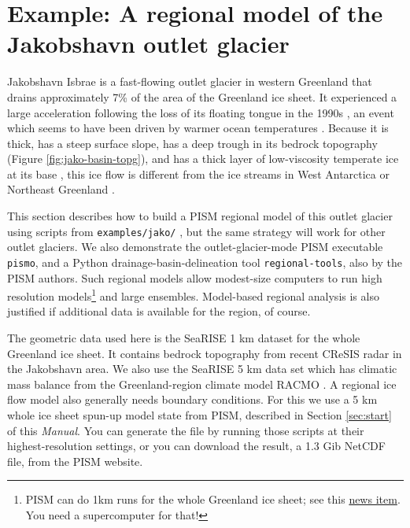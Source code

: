 
\section{Example: A regional model of the Jakobshavn outlet glacier}\label{sec:jako}  


Jakobshavn Isbrae is a fast-flowing outlet glacier in western Greenland that drains approximately 7\% of the area of the Greenland ice sheet.  It experienced a large acceleration following the loss of its floating tongue in the 1990s \cite{JoughinAbdalatiFahnestock}, an event which seems to have been driven by warmer ocean temperatures \cite{Hollandetal2008}.  Because it is thick, has a steep surface slope, has a deep trough in its bedrock topography (Figure \ref{fig:jako-basin-topg}), and has a thick layer of low-viscosity temperate ice at its base \cite{Luethietal2009}, this ice flow is different from the ice streams in West Antarctica or Northeast Greenland \cite{TrufferEchelmeyer}.
 
This section describes how to build a PISM regional model of this outlet glacier using scripts from \texttt{examples/jako/} \cite{DellaGiustina2011}, but the same strategy will work for other outlet glaciers.  We also demonstrate the outlet-glacier-mode PISM executable \texttt{pismo}, and a Python drainage-basin-delineation tool \texttt{regional-tools}, also by the PISM authors.  Such regional models allow modest-size computers to run high resolution models\footnote{PISM can do 1km runs for the whole Greenland ice sheet; see this \href{http://www.pism-docs.org/wiki/doku.php?id=news:first1km}{news item}.  You need a supercomputer for that!} and large ensembles.  Model-based regional analysis is also justified if additional data is available for the region, of course.

The geometric data used here is the SeaRISE  \cite{Bindshadler2012SeaRISE} 1 km dataset for the whole Greenland ice sheet.  It contains bedrock topography from recent CReSIS radar in the Jakobshavn area.  We also use the SeaRISE 5 km data set which has climatic mass balance from the Greenland-region climate model RACMO \cite{Ettemaetal2009}.  A regional ice flow model also generally needs boundary conditions.  For this we use a 5 km whole ice sheet spun-up model state from PISM, described in Section \ref{sec:start} of this \emph{Manual}.  You can generate the file by running those scripts at their highest-resolution settings, or you can download the result, a 1.3 Gib NetCDF file, from the PISM website.

